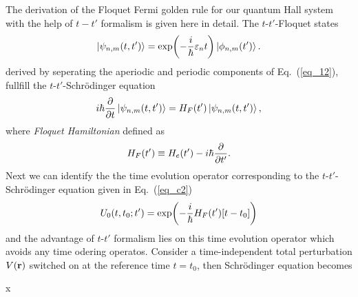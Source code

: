 The derivation of the Floquet Fermi golden rule for our quantum Hall system with the help of $t-t'$ formalism is given here in detail. The $t$-$t'$-Floquet states \cite{grifoni98,wackerl20}
\begin{equation} \label{eq_c1}
  \ket{\psi_{n,m}(t,t')} =
  \exp(-\frac{i}{\hbar}\varepsilon_{n} t)\ket{\phi_{n,m}(t')}.
\end{equation}
derived by seperating the aperiodic and periodic components of Eq.~(\ref{eq_12}), fullfill the $t$-$t'$-Schrödinger equation \cite{grifoni98,wackerl20}
\begin{equation} \label{eq_c2}
  i \hbar \pdv{t}\ket{\psi_{n,m}(t,t')} =
  H_F(t') \ket{\psi_{n,m}(t,t')},
\end{equation}
where \textit{Floquet Hamiltonian} defined as
\begin{equation} \label{eq_c3}
  H_F(t') \equiv
  H_e(t') - i\hbar \pdv{t'}.
\end{equation}
Next we can identify the the time evolution operator \cite{wackerl20} corresponding to the $t$-$t'$-Schrödinger equation given in Eq.~(\ref{eq_c2})
\begin{equation} \label{eq_c4}
  U_0(t,t_0;t') = \exp(-\frac{i}{\hbar}H_F(t')\qty[t-t_0])
\end{equation}
and the advantage of $t$-$t'$ formalism lies on this time evolution operator which avoids any time odering operatos.
Consider a time-independent total perturbation $V(\vb{r})$ switched on at the reference time $t=t_0$, then Schrödinger equation becomes
























x

